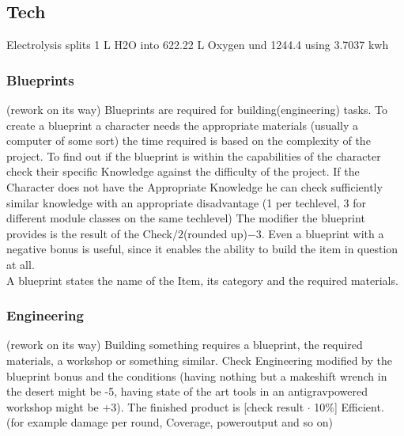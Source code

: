     \subsection{Tech}\label{subsec:tech}
    Electrolysis splits 1 L H2O into 622.22 L Oxygen und 1244.4 using 3.7037 kwh\\
    \subsubsection{Blueprints}
(rework on its way)
    Blueprints are required for building(engineering) tasks.
    To create a blueprint a character needs the appropriate materials
    (usually a computer of some sort) the time required is based on the complexity of the project.
    To find out if the
    blueprint is within the capabilities of the character check their specific Knowledge against the difficulty of the
    project.
    If the Character does not have the Appropriate Knowledge he can check sufficiently similar knowledge with
    an appropriate disadvantage (1 per techlevel, 3 for different module classes on the same techlevel)
    The modifier the blueprint provides is the result of the Check\(/2\)(rounded up)\(-3\).
    Even a blueprint with a negative bonus is useful, since it enables the ability to build the item in question at all.\\
    A blueprint states the name of the Item, its category and the required materials.\vspace{1.5cm}
    \subsubsection{Engineering}
(rework on its way)
    Building something requires a blueprint, the required materials, a workshop or something similar.
    Check Engineering
    modified by the blueprint bonus and the conditions (having nothing but a makeshift wrench in the desert might be -5, having state of the art
    tools in an antigravpowered workshop might be +3).
    The finished product is [check result \(\cdot\) 10\%] Efficient.
    (for example damage per round, Coverage, poweroutput and so on)\vspace{1.5cm}